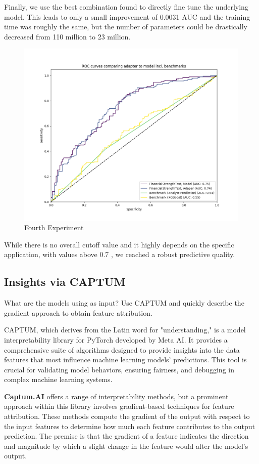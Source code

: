 \documentclass[conference]{IEEEtran}
\begin{document}
Finally, we use the best combination found to directly fine tune the underlying model. This leads to only a small improvement of 0.0031 AUC and the training time was roughly the same, but the number of parameters could be drastically decreased from 110 million to 23 million.

\begin{figure}[H]
    \centering
    \includegraphics[width=.85\linewidth]{../3. evaluation/roc_curves/Fourth Experiment.png}
    \caption[Fourth Experiment]{Fourth Experiment}
    \label{fig:Fourthexp}
\end{figure}

While there is no overall cutoff value and it highly depends on the specific application, with values above 0.7 \cite{Hosmer2013}, we reached a robust predictive quality.

\subsection{Insights via CAPTUM}%
What are the models using as input? Use CAPTUM and quickly describe the gradient approach to obtain feature attribution. \cite{Kokhlikyan2020}

CAPTUM, which derives from the Latin word for "understanding," is a model interpretability library for PyTorch developed by Meta AI. It provides a comprehensive suite of algorithms designed to provide insights into the data features that most influence machine learning models' predictions. This tool is crucial for validating model behaviors, ensuring fairness, and debugging in complex machine learning systems.

\textbf{Captum.AI} offers a range of interpretability methods, but a prominent approach within this library involves gradient-based techniques for feature attribution. These methods compute the gradient of the output with respect to the input features to determine how much each feature contributes to the output prediction. The premise is that the gradient of a feature indicates the direction and magnitude by which a slight change in the feature would alter the model's output.
\end{document}
